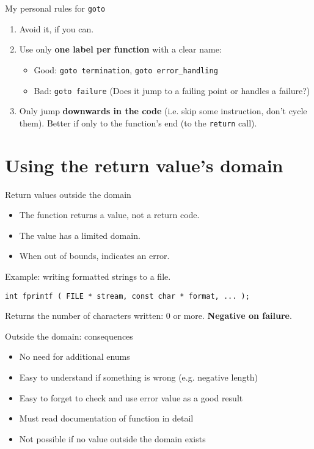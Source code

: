 \documentclass[aspectratio=169,14pt]{beamer}
\begin{document}
\begin{frame}{My personal rules for \texttt{goto}}
\begin{enumerate}
    \item Avoid it, if you can.
    \item Use only \textbf{one label per function} with a clear name:
        \begin{itemize}
            \item Good: \texttt{goto termination}, \texttt{goto error\_handling}
            \item Bad: \texttt{goto failure}  (Does it jump to a failing point or handles a failure?)
        \end{itemize}
    \item Only jump \textbf{downwards in the code} (i.e. skip some instruction, don’t cycle them). Better if only to the function's end (to the \texttt{return} call).
\end{enumerate}
\end{frame}





\section{Using the return value's domain}

\begin{frame}[fragile]{Return values outside the domain}

\begin{itemize}
    \item The function returns a value, not a return code.
    \item The value has a limited domain.
    \item When out of bounds, indicates an error.
\end{itemize}

Example: writing formatted strings to a file.

\begin{lstlisting}[style=cstyle]
int fprintf ( FILE * stream, const char * format, ... );
\end{lstlisting}

Returns the number of characters written: 0 or more. \textbf{Negative on failure}. 
\end{frame}



\begin{frame}[fragile]{Outside the domain: consequences}
\begin{itemize}
    \item[\good] No need for additional enums
    \item[\good] Easy to understand if something is wrong (e.g. negative length)
    \item[\bad] Easy to forget to check and use error value as a good result
    \item[\bad] Must read documentation of function in detail 
    \item[\bad] Not possible if no value outside the domain exists
\end{itemize}
\end{frame}
\end{document}
